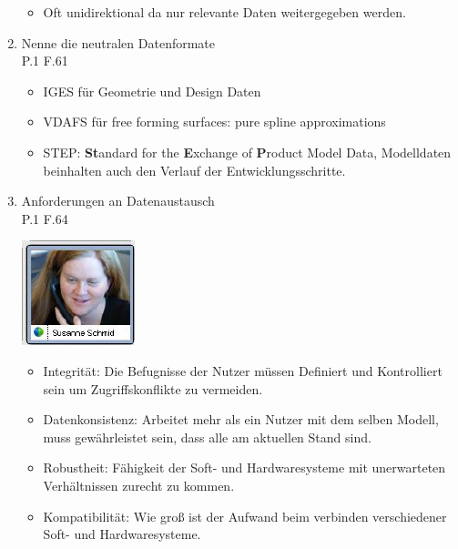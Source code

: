 \documentclass[10pt,a4paper,fleqn]{article}
\begin{document}
\begin{enumerate}
\begin{itemize}
				\item Oft unidirektional da nur relevante Daten weitergegeben werden.
			\end{itemize}
\item Nenne die neutralen Datenformate\\
	P.1 F.61
	\begin{itemize}
		\item IGES für Geometrie und Design Daten
		\item VDAFS für free forming surfaces: pure spline approximations
		\item STEP: \textbf{St}andard for the \textbf{E}xchange of \textbf{P}roduct Model Data, Modelldaten beinhalten auch den Verlauf der Entwicklungsschritte.
	\end{itemize}
\item Anforderungen an Datenaustausch\\
	P.1 F.64
	\begin{center}
		\includegraphics[scale=1]{susi.png}
	\end{center}
	\begin{itemize}
		\item Integrität: Die Befugnisse der Nutzer müssen Definiert und Kontrolliert sein um Zugriffskonflikte zu vermeiden.
		\item Datenkonsistenz: Arbeitet mehr als ein Nutzer mit dem selben Modell, muss gewährleistet sein, dass alle am aktuellen Stand sind.
		\item Robustheit: Fähigkeit der Soft- und Hardwaresysteme mit unerwarteten Verhältnissen zurecht zu kommen.
		\item Kompatibilität: Wie groß ist der Aufwand beim verbinden verschiedener Soft- und Hardwaresysteme.
	\end{itemize}

\end{enumerate}
\end{document}
